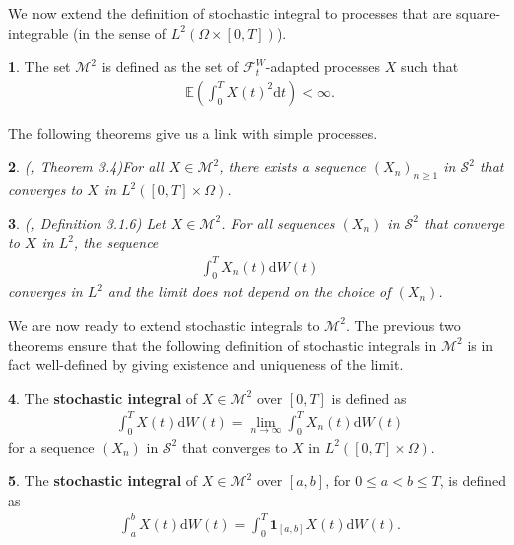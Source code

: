 \documentclass[english]{article}
\numberwithin{equation}{section}
\numberwithin{figure}{section}
\theoremstyle{bolddescit}
\newtheorem{theorem}{\protect\theoremname}[section]
\theoremstyle{definition}
\newtheorem{definition}[theorem]{\protect\definitionname}
\theoremstyle{definition}
\theoremstyle{plain}
\theoremstyle{plain}
\theoremstyle{bolddesc}
\theoremstyle{plain}
\theoremstyle{remark}
\providecommand{\definitionname}{Definition}
\providecommand{\theoremname}{Theorem}
\begin{document}
We now extend the definition of stochastic integral to processes that are square-integrable (in the sense of $L^2(\Omega \times [0,T])$).

\begin{definition}
  The set $\mathcal{M}^2$ is defined as the set of $\mathcal{F}^W_t$-adapted processes $X$ such that
  \begin{align*}
    \mathbb{E}\left(\int_0^T X(t)^2 \mathrm{d}t \right) < \infty.
  \end{align*}
\end{definition}

The following theorems give us a link with simple processes.

\begin{theorem}
  (\cite{capinski_stochastic_2012}, Theorem 3.4)\label{thm:s2-m2-conv}
  For all $X \in \mathcal{M}^2$, there exists a sequence $(X_n)_{n \ge 1}$ in $\mathcal{S}^2$ that converges to $X$ in $L^2([0,T] \times \Omega)$.
\end{theorem}

\begin{theorem}
  (\cite{oksendal_stochastic_2003}, Definition 3.1.6)
  Let $X \in \mathcal{M}^2$. For all sequences $(X_n)$ in $\mathcal{S}^2$ that converge to $X$ in $L^2$, the sequence
  \begin{align*}
    \int_0^T X_n(t) \mathrm{d}W(t)
  \end{align*}
  converges in $L^2$ and the limit does not depend on the choice of $(X_n)$.
\end{theorem}

We are now ready to extend stochastic integrals to $\mathcal{M}^2$. The previous two theorems ensure that the following definition of stochastic integrals in $\mathcal{M}^2$ is in fact well-defined by giving existence and uniqueness of the limit.

\begin{definition}
  The \textbf{stochastic integral} of $X \in \mathcal{M}^2$ over $[0,T]$ is defined as
  \begin{align*}
    \int_0^T X(t) \mathrm{d}W(t) = \lim_{n \to \infty} \int_0^T X_n(t) \mathrm{d}W(t)
  \end{align*}
  for a sequence $(X_n)$ in $\mathcal{S}^2$ that converges to $X$ in $L^2([0,T] \times \Omega)$.
\end{definition}

\begin{definition}
  The \textbf{stochastic integral} of $X \in \mathcal{M}^2$ over $[a,b]$, for $0 \le a < b \le T$, is defined as
  \begin{align*}
    \int_a^b X(t) \mathrm{d}W(t)
    = \int_0^T \mathbf{1}_{[a,b]} X(t) \mathrm{d}W(t).
  \end{align*}
\end{definition}
\end{document}
